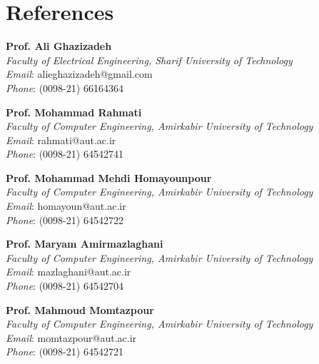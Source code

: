 \section{\sc References}

{\bf Prof. Ali Ghazizadeh}\\
{\it Faculty of Electrical Engineering, Sharif University of Technology}\\
{\textit{Email}}: alieghazizadeh@gmail.com\\
\textit{Phone}: (0098-21) 66164364

{\bf Prof. Mohammad Rahmati}\\
{\it Faculty of Computer Engineering, Amirkabir University of Technology}\\
{\textit{Email}}: rahmati@aut.ac.ir\\
\textit{Phone}: (0098-21) 64542741

{\bf Prof. Mohammad Mehdi Homayounpour}\\
{\it Faculty of Computer Engineering, Amirkabir University of Technology}\\
{\textit{Email}}: homayoun@aut.ac.ir\\
\textit{Phone}: (0098-21) 64542722

{\bf Prof. Maryam Amirmazlaghani}\\
{\it Faculty of Computer Engineering, Amirkabir University of Technology}\\
{\textit{Email}}: mazlaghani@aut.ac.ir\\
\textit{Phone}: (0098-21) 64542704

{\bf Prof. Mahmoud Momtazpour}\\
{\it Faculty of Computer Engineering, Amirkabir University of Technology}\\
{\textit{Email}}: momtazpour@aut.ac.ir\\
\textit{Phone}: (0098-21) 64542721
\endinput